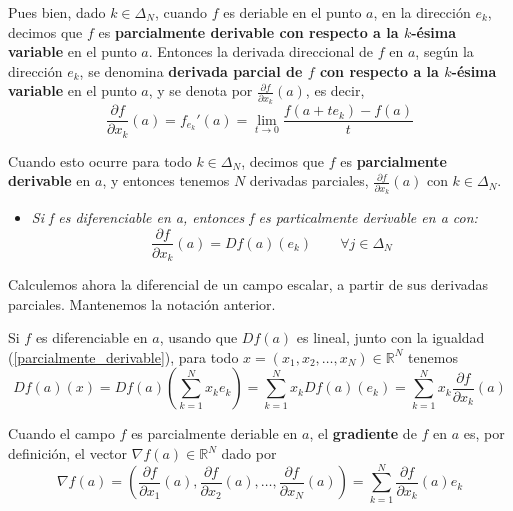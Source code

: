 \documentclass[a4paper, 12pt]{article}
\begin{document}
\begin{enumerate}[label=\textbf{\arabic*}.]
Pues bien, dado \(k \in \Delta_N\), cuando \(f\) es deriable en el punto \(a\), en la dirección \(e_k\), decimos que \(f\) es \textbf{parcialmente derivable con respecto a la \(k\)-ésima variable} en el punto \(a\). Entonces la derivada direccional de \(f\) en \(a\), según la dirección \(e_k\), se denomina \textbf{derivada parcial de \(f\) con respecto a la \(k\)-ésima variable} en el punto \(a\), y se denota por \(\frac{\partial f}{\partial x_k} (a)\), es decir,
\begin{equation}\label{derivada_parcial}
	\frac{\partial f}{\partial x_k} (a) = f_{e_k}' (a) = \lim_{t \to 0} \frac{f(a + t e_k) - f(a)}{t}
\end{equation}

Cuando esto ocurre para todo \(k \in \Delta_N\), decimos que \(f\) es \textbf{parcialmente derivable} en \(a\), y entonces tenemos \(N\) derivadas parciales, \(\frac{\partial f}{\partial x_k} (a)\) con \(k \in \Delta_N\). 

\begin{itemize}
	\item \textit{Si f es diferenciable en a, entonces f es particalmente derivable en a con:}
	\begin{equation} \label{parcialmente_derivable}
		\frac{\partial f}{\partial x_k} (a) = Df(a)(e_k) \qquad \forall j \in \Delta_N
	\end{equation}
\end{itemize} 

\par

Calculemos ahora la diferencial de un campo escalar, a partir de sus derivadas parciales. Mantenemos la notación anterior.

Si \(f\) es diferenciable en \(a\), usando que \(Df(a)\) es lineal, junto con la igualdad (\ref{parcialmente_derivable}), para todo \(x = (x_1, x_2, \dotsc, x_N) \in \mathbb{R}^N\) tenemos
\[
	Df(a)(x) = Df(a) \left( \sum_{k=1}^{N} x_k e_k \right) = \sum_{k=1}^{N} x_k Df(a) (e_k) = \sum_{k=1}^{N} x_k \frac{\partial f}{\partial x_k} (a)
\] 

Cuando el campo \(f\) es parcialmente deriable en \(a\), el \textbf{gradiente} de \(f\) en \(a\) es, por definición, el vector \(\nabla f(a) \in \mathbb{R}^N\) dado por
\[
	\nabla f(a) = \left( \frac{\partial f}{\partial x_1} (a), \frac{\partial f}{\partial x_2} (a), \dotsc, \frac{\partial f}{\partial x_N} (a) \right) = \sum_{k=1}^{N} \frac{\partial f}{\partial x_k} (a) e_k
\]


\end{enumerate}
\end{document}
